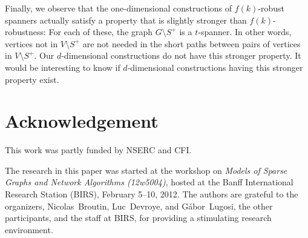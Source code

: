 \documentclass{sig-alternate}
\begin{document}
Finally, we observe that the one-dimensional constructions of
$f(k)$-robust spanners actually satisfy a property that is slightly
stronger than $f(k)$-robustness:  For each of these, the graph $G\setminus
S^+$ is a $t$-spanner.  In other words, vertices not in $V\setminus
S^+$ are not needed in the short paths between pairs of vertices in
$V\setminus S^+$.  Our $d$-dimensional constructions do not have this
stronger property.  It would be interesting to know if $d$-dimensional
constructions having this stronger property exist.

\section*{Acknowledgement}

This work was partly funded by NSERC and CFI.

The research in this paper was started at the workshop on \emph{Models
of Sparse Graphs and Network Algorithms (12w5004)}, hosted at the
Banff International Research Station (BIRS), February 5--10, 2012.
The authors are grateful to the organizers, \mbox{Nicolas~Broutin},
\mbox{Luc~Devroye}, and \mbox{G\'abor~Lugosi}, the other participants, and the staff
at BIRS, for providing a stimulating research environment.



\end{document}
